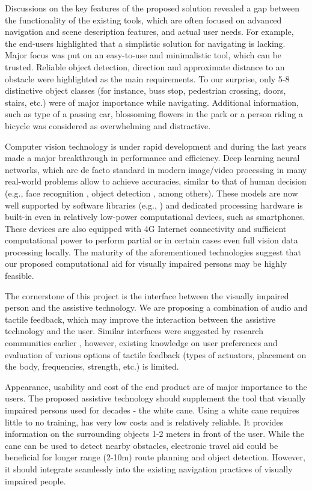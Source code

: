 \documentclass[10pt,conference,compsocconf]{IEEEtran}
\begin{document}
Discussions on the key features of the proposed solution revealed a gap between the functionality of the existing tools, which are often focused on advanced navigation and scene description features, and actual user needs. For example, the end-users highlighted that a simplistic solution for navigating is lacking. Major focus was put on an easy-to-use and minimalistic tool, which can be trusted. Reliable object detection, direction and approximate distance to an obstacle were highlighted as the main requirements. To our surprise, only 5-8 distinctive object classes (for instance, buss stop, pedestrian crossing, doors, stairs, etc.) were of major importance while navigating. Additional information, such as type of a passing car, blossoming flowers in the park or a person riding a bicycle was considered as overwhelming and distractive. 

Computer vision technology is under rapid development and during the last years made a major breakthrough in performance and efficiency. Deep learning neural networks, which are de facto standard in modern image/video processing in many real-world problems allow to achieve accuracies, similar to that of human decision (e.g., face recognition \cite{Amos}, object detection \cite{Ren}, among others). These models are now well supported by software libraries (e.g., \cite{Tensorflow}) and dedicated processing hardware is built-in even in relatively low-power computational devices, such as smartphones. These devices are also equipped with 4G Internet connectivity and sufficient computational power to perform partial or in certain cases even full vision data processing locally. The maturity of the aforementioned technologies suggest that our proposed computational aid for visually impaired persons may be highly feasible. 


The cornerstone of this project is the interface between the visually impaired person and the assistive technology. We are proposing a combination of audio and tactile feedback, which may improve the interaction between the assistive technology and the user. Similar interfaces were suggested by research communities earlier \cite{Poggi}\cite{Zientara}, however, existing knowledge on user preferences and evaluation of various options of tactile feedback (types of actuators, placement on the body, frequencies, strength, etc.) is limited. 

Appearance, usability and cost of the end product are of major importance to the users. The proposed assistive technology should supplement the tool that visually impaired persons used for decades - the white cane. Using a white cane requires little to no training, has very low costs and is relatively reliable. It provides information on the surrounding objects 1-2 meters in front of the user. While the cane can be used to detect nearby obstacles, electronic travel aid could be beneficial for longer range (2-10m) route planning and object detection. However, it should integrate seamlessly into the existing navigation practices of visually impaired people. 
\end{document}
